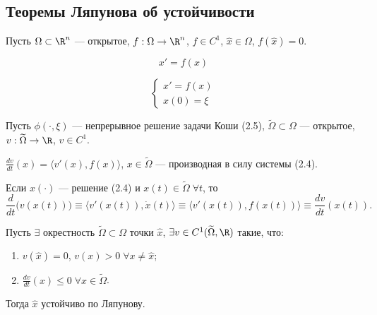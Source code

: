 
\subsection{Теоремы Ляпунова об устойчивости}

Пусть \(\Omega \subset \R^n\) --- открытое, \(f: \Omega \to \R^n\), \(f \in C^1\), \(\widehat{x} \in \Omega\), \(f(\widehat{x}) = 0\).

\begin{equation}
    x' = f(x)
\end{equation}

\begin{equation}
    \begin{cases}
        x' = f(x) \\
        x(0) = \xi
    \end{cases}
\end{equation}

Пусть \(\phi(\cdot, \xi)\) --- непрерывное решение задачи Коши (2.5), \(\widetilde{\Omega} \subset \Omega\) --- открытое, \(v: \widetilde{\Omega} \to \R\), \(v \in C^1\).

\begin{definition}
    \(\displaystyle \frac{dv}{dt}(x) = \langle v'(x), f(x) \rangle\), \(x \in \widetilde{\Omega}\) --- производная в силу системы (2.4).

    Если \(x(\cdot)\) --- решение (2.4) и \(x(t) \in \widetilde{\Omega} \; \forall t\), то
    \[
    \frac{d}{dt}\bigl(v(x(t))\bigr) \equiv \langle v'(x(t)), \dot{x}(t) \rangle \equiv \langle v'(x(t)), f(x(t)) \rangle \equiv \frac{dv}{dt}(x(t)).
    \]
\end{definition}

\begin{theorem}
    Пусть \(\exists\) окрестность \(\widetilde{\Omega} \subset \Omega\) точки \(\widehat{x}\), \(\exists v \in C^1(\widetilde{\Omega}, \R)\) такие, что:
    \begin{enumerate}
        \item \(v(\widehat{x}) = 0\), \(v(x) > 0 \; \forall x \ne \widehat{x}\);
        \item \(\displaystyle \frac{dv}{dt}(x) \le 0 \; \forall x \in \widetilde{\Omega}\).
    \end{enumerate}
    Тогда \(\widehat{x}\) устойчиво по Ляпунову.
\end{theorem}

